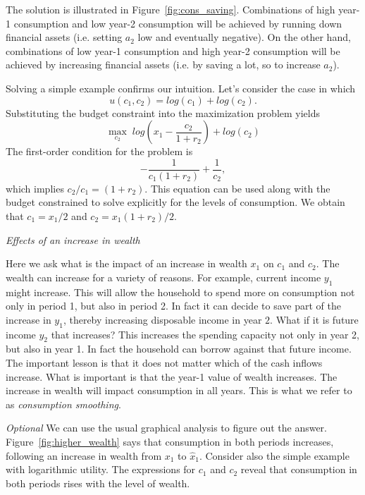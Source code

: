 \documentclass[letterpaper,12pt]{article}
\begin{document}
The solution is illustrated in Figure~\ref{fig:cons_saving}.
Combinations of high year-1 consumption and low year-2 consumption
will be achieved by running down financial assets (i.e. setting
$a_{2}$ low and eventually negative). On the other hand,
combinations of low year-1 consumption and high year-2 consumption
will be achieved by increasing financial assets (i.e. by saving a
lot, so to increase $a_{2}$).

Solving a simple example confirms our intuition. Let's consider
the case in which
%
\begin{equation*}
u(c_{1},c_{2})=log(c_{1}) + log(c_{2}).
\end{equation*}
%
Substituting the budget constraint into the maximization problem
yields
%
\begin{equation*}
\max_{c_{2}}\; log\left(x_{1}-\frac{c_{2}}{1+r_{2}}\right) + log (c_{2})%
\end{equation*}
%
The first-order condition for the problem is
%
\begin{equation*}
-\frac{1}{c_{1}(1+r_{2})}+\frac{1}{c_{2}},
\end{equation*}
%
which implies $c_{2}/c_{1}=(1+r_{2})$. This equation can be used
along with the budget constrained to solve explicitly for the
levels of consumption. We obtain that $c_{1}=x_{1}/2$ and
$c_{2}=x_{1}(1+r_{2})/2$. \normalsize

\newpage

\textit{Effects of an increase in wealth}

Here we ask what is the impact of an increase in wealth $x_{1}$ on
$c_{1}$ and $c_{2}$. The wealth can increase for a variety of
reasons. For example, current income $y_{1}$ might increase. This
will allow the household to spend more on consumption not only in
period 1, but also in period 2. In fact it can decide to save part
of the increase in $y_{1}$, thereby increasing disposable income
in year $2$. What if it is future income $y_{2}$ that increases?
This increases the spending capacity not only in year 2, but also
in year 1. In fact the household can borrow against that future
income. The important lesson is that it does not matter which of
the cash inflows increase. What is important is that the year-1
value of wealth increases. The increase in wealth will impact
consumption in all years. This is what we refer to as
\textit{consumption smoothing}.

\textit{Optional} \footnotesize We can use the usual graphical
analysis to figure out the answer. Figure~\ref{fig:higher_wealth}
says that consumption in both periods increases, following an
increase in wealth from $x_{1}$ to $\hat{x}_{1}$. Consider also
the simple example with logarithmic utility. The expressions for
$c_{1}$ and $c_{2}$ reveal that consumption in both periods rises
with the level of wealth.\normalsize
\end{document}

